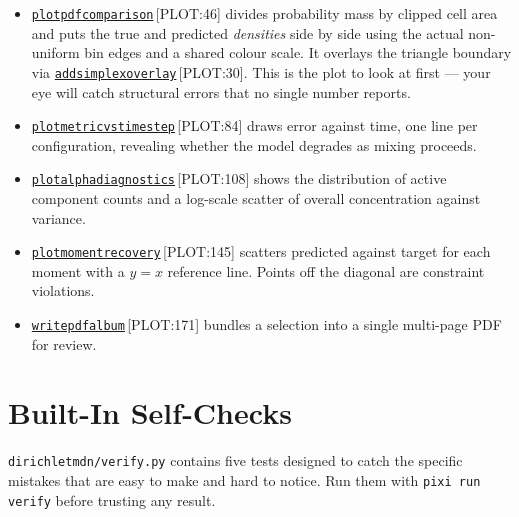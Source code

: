 \documentclass[11pt,a4paper]{report}
\newcommand{\srcbase}{vscode://file/Users/syellapa/Documents/Research/2026/ANSYS/Multi-ScalarPDF}
\newcommand{\dmdn}{dirichlet\string_mdn}
\newcommand{\srctag}[1]{{\footnotesize\textcolor{TagGray}{[#1]}}}
\newcommand{\Plot}[2]{\href{\srcbase/\dmdn/plotting.py:#1}{\texttt{#2}}\,\srctag{PLOT:#1}}
\newcommand{\code}[1]{\texttt{#1}}
\renewcommand{\_}{\origtextunderscore\allowbreak}
\begin{document}
\begin{itemize}
  \item \Plot{46}{plot\_pdf\_comparison} divides probability mass by clipped cell area and puts
        the true and predicted \emph{densities} side by side using the actual non-uniform bin
        edges and a shared colour scale. It overlays the triangle boundary via
        \Plot{30}{\_add\_simplex\_overlay}. This is the plot to look at first --- your eye will
        catch structural errors that no single number reports.
  \item \Plot{84}{plot\_metric\_vs\_timestep} draws error against time, one line per
        configuration, revealing whether the model degrades as mixing proceeds.
  \item \Plot{108}{plot\_alpha\_diagnostics} shows the distribution of active component counts
        and a log-scale scatter of overall concentration against variance.
  \item \Plot{145}{plot\_moment\_recovery} scatters predicted against target for each moment
        with a $y = x$ reference line. Points off the diagonal are constraint violations.
  \item \Plot{171}{write\_pdf\_album} bundles a selection into a single multi-page PDF for
        review.
\end{itemize}

\chapter{Built-In Self-Checks}

\code{dirichlet\_mdn/verify.py} contains five tests designed to catch the specific mistakes
that are easy to make and hard to notice. Run them with \code{pixi run verify} before trusting
any result.
\end{document}
